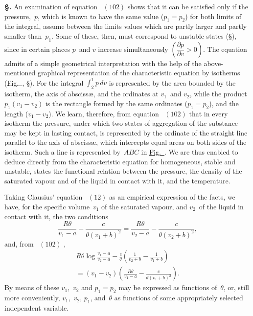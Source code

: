 \documentclass[12pt]{book}[2005/09/16]
\newcommand{\Section}[1]{
  \medskip\par\textbf{§\;#1}
  \label{section:#1}
}
\newcommand{\SecRef}[2][§\;]{\hyperref[section:#2.]{{\upshape #1#2}}}
\newcommand{\Eq}[1]{%
  \hyperref[eqn:#1]{\ensuremath{#1}}%
}
\newcommand{\Fig}[1]{\hyperref[fig:#1]{Fig.~{\upshape #1}}}
\newcommand{\PageSep}[1]{\ignorespaces}
\newcommand{\dd}{\partial}
\begin{document}
\Section{172.} An examination of equation~\Eq{(102)} shows that it
can be satisfied only if the pressure,~$p$, which is known to
have the same value ($p_{1} = p_{2}$) for both limits of the integral,
assume between the limits values which are partly larger
and partly smaller than~$p_{1}$. Some of these, then, must
correspond to unstable states (\SecRef{169}), since in certain places
$p$~and $v$ increase simultaneously $\left(\dfrac{\dd p}{\dd v} > 0\right)$. The equation
admits of a simple geometrical interpretation with the help
of the above-mentioned graphical representation of the
characteristic equation by isotherms (\Fig{1}, \SecRef{26}). For
the integral $\displaystyle\int_{2}^{1} p\, dv$ is represented by the area bounded by
\PageSep{140}
%
the isotherm, the axis of abscissæ, and the ordinates at $v_{1}$~and
$v_{2}$, while the product $p_{1} (v_{1} - v_{2})$ is the rectangle formed
by the same ordinates ($p_{1} = p_{2}$), and the length ($v_{1} - v_{2}$).
We learn, therefore, from equation~\Eq{(102)} that in every
isotherm the pressure, under which two states of aggregation
of the substance may be kept in lasting contact, is represented
by the ordinate of the straight line parallel to the
axis of abscissæ, which intercepts equal areas on both sides
of the isotherm. Such a line is represented by~$ABC$ in
\Fig{1}. We are thus enabled to deduce directly from the
characteristic equation for homogeneous, stable and unstable,
states the functional relation between the pressure, the
density of the saturated vapour and of the liquid in contact
with it, and the temperature.

Taking Clausius' equation~\Eq{(12)} as an empirical expression
%
%
of the facts, we have, for the specific volume~$v_{1}$ of the
saturated vapour, and $v_{2}$~of the liquid in contact with it,
the two conditions
\[
\frac{R\theta}{v_{1} - a} - \frac{c}{\theta (v_{1} + b)^{2}}
  = \frac{R\theta}{v_{2} - a} - \frac{c}{\theta (v_{2} + b)^{2}},
\]
and, from~\Eq{(102)},
\begin{multline*}
R\theta \log \frac{v_{1} - a}{v_{2} - a} - \frac{c}{\theta} \left(\frac{1}{v_{2} + b} - \frac{1}{v_{1} + b}\right) \\
  = (v_{1} - v_{2}) \left(\frac{R\theta}{v_{1} - a} - \frac{c}{\theta (v_{1} + b)^{2}}\right).
\end{multline*}
By means of these $v_{1}$,~$v_{2}$ and $p_{1} = p_{2}$ may be expressed as
functions of~$\theta$, or, still more conveniently, $v_{1}$,~$v_{2}$, $p_{1}$, and~$\theta$ as
functions of some appropriately selected independent variable.
\end{document}
